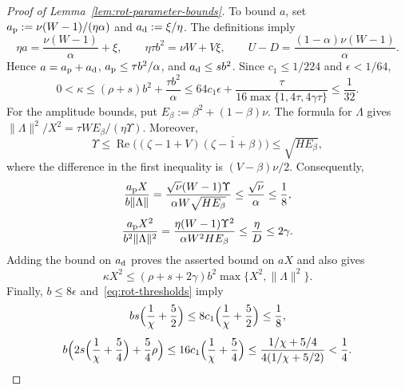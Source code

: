 \begin{proof}[Proof of Lemma~\ref{lem:rot-parameter-bounds}]
To bound \(a\), set
\(a_{\rm p}:=\nu(W-1)/(\eta\alpha)\) and \(a_{\rm d}:=\xi/\eta\).
The definitions imply
\begin{equation}
\label{eq:rot-algebra-identities}
\eta a=\frac{\nu(W-1)}\alpha+\xi,
\qquad \eta\tau b^2=\nu W+V\xi,
\qquad U-D=\frac{(1-\alpha)\nu(W-1)}\alpha.
\end{equation}
Hence \(a=a_{\rm p}+a_{\rm d}\),
\(a_{\rm p}\le\tau b^2/\alpha\), and \(a_{\rm d}\le sb^2\).
Since \(c_1\le1/224\) and \(\epsilon<1/64\),
\[
0<\kappa\le(\rho+s)b^2+\frac{\tau b^2}\alpha
\le64c_1\epsilon+\frac{\tau}{16\max\{1,4\tau,4\gamma\tau\}}
\le\frac1{32}.
\]
For the amplitude bounds, put \(E_\beta:=\beta^2+(1-\beta)\nu\).
The formula for \(\Lambda\) gives
\(\|\Lambda\|^2/X^2=\tau WE_\beta/(\eta\Upsilon)\).
Moreover,
\[
\Upsilon\le
\operatorname{Re}\bigl((\zeta-1+V)\overline{(\zeta-1+\beta)}\bigr)
\le\sqrt{HE_\beta},
\]
where the difference in the first inequality is \((V-\beta)\nu/2\).
Consequently,
\[
\frac{a_{\rm p}X}{b\|\Lambda\|}
=\frac{\sqrt\nu(W-1)\Upsilon}{\alpha W\sqrt{HE_\beta}}
\le\frac{\sqrt\nu}\alpha\le\frac18,
\]
\[
\frac{a_{\rm p}X^2}{b^2\|\Lambda\|^2}
=\frac{\eta(W-1)\Upsilon^2}{\alpha W^2HE_\beta}
\le\frac\eta D\le2\gamma.
\]
Adding the bound on \(a_{\rm d}\) proves the asserted bound on \(aX\)
and also gives
\begin{equation}
\label{eq:rot-gap-curvature}
\kappa X^2\le(\rho+s+2\gamma)b^2\max\{X^2,\|\Lambda\|^2\}.
\end{equation}
Finally, \(b\le8\epsilon\) and~\eqref{eq:rot-thresholds} imply
\[
bs\Bigl(\frac1\chi+\frac52\Bigr)
\le8c_1\Bigl(\frac1\chi+\frac52\Bigr)\le\frac18,
\]
\[
b\Bigl(2s\Bigl(\frac1\chi+\frac54\Bigr)+\frac54\rho\Bigr)
\le16c_1\Bigl(\frac1\chi+\frac54\Bigr)
\le\frac{1/\chi+5/4}{4(1/\chi+5/2)}<\frac14.
\]
\end{proof}

